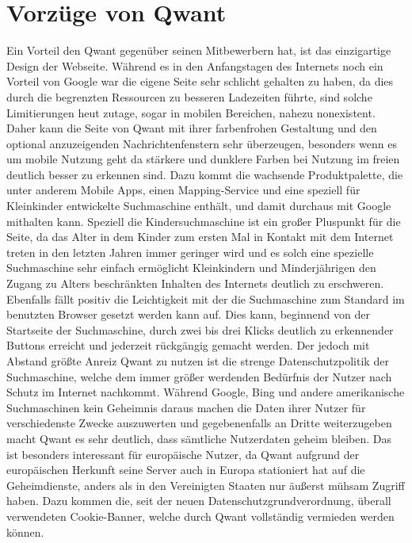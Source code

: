 \section{Vorzüge von Qwant}\label{sec:vorzuge-von-qwant}
Ein Vorteil den Qwant gegenüber seinen Mitbewerbern hat, ist das einzigartige Design der Webseite.
Während es in den Anfangstagen des Internets noch ein Vorteil von Google war die eigene Seite sehr schlicht gehalten zu
haben, da dies durch die begrenzten Ressourcen zu besseren Ladezeiten führte, sind solche Limitierungen heut zutage, sogar
in mobilen Bereichen, nahezu nonexistent.
Daher kann die Seite von Qwant mit ihrer farbenfrohen Gestaltung und den optional anzuzeigenden Nachrichtenfenstern sehr
überzeugen, besonders wenn es um mobile Nutzung geht da stärkere und dunklere Farben bei Nutzung im freien deutlich besser
zu erkennen sind.
Dazu kommt die wachsende Produktpalette, die unter anderem Mobile Apps, einen Mapping-Service und eine speziell für
Kleinkinder entwickelte Suchmaschine enthält, und damit durchaus mit Google mithalten kann.
Speziell die Kindersuchmaschine ist ein großer Pluspunkt für die Seite, da das Alter in dem Kinder zum ersten Mal in
Kontakt mit dem Internet treten in den letzten Jahren immer geringer wird und es solch eine spezielle Suchmaschine
sehr einfach ermöglicht Kleinkindern und Minderjährigen den Zugang zu Alters beschränkten Inhalten des Internets
deutlich zu erschweren.
Ebenfalls fällt positiv die Leichtigkeit mit der die Suchmaschine zum Standard im benutzten Browser gesetzt werden kann auf.
Dies kann, beginnend von der Startseite der Suchmaschine, durch zwei bis drei Klicks deutlich zu erkennender Buttons
erreicht und jederzeit rückgängig gemacht werden.
Der jedoch mit Abstand größte Anreiz Qwant zu nutzen ist die strenge Datenschutzpolitik der Suchmaschine, welche dem
immer größer werdenden Bedürfnis der Nutzer nach Schutz im Internet nachkommt.
Während Google, Bing und andere amerikanische Suchmaschinen kein Geheimnis daraus machen die Daten ihrer Nutzer für
verschiedenste Zwecke auszuwerten und gegebenenfalls an Dritte weiterzugeben macht Qwant es sehr deutlich, dass sämtliche
Nutzerdaten geheim bleiben.
Das ist besonders interessant für europäische Nutzer, da Qwant aufgrund der europäischen Herkunft seine Server auch in Europa
stationiert hat auf die Geheimdienste, anders als in den Vereinigten Staaten nur äußerst mühsam Zugriff haben.
Dazu kommen die, seit der neuen Datenschutzgrundverordnung, überall verwendeten Cookie-Banner, welche durch Qwant
vollständig vermieden werden können.


